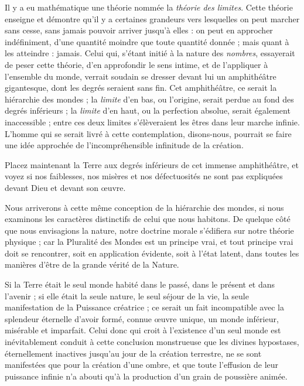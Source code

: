 \documentclass[a4paper, 11pt, oneside, landscape]{article}
\begin{document}
Il y a eu mathématique une théorie nommée la \emph{théorie des limites}. Cette théorie enseigne et démontre qu'il y a certaines grandeurs vers lesquelles on peut marcher sans cesse, sans jamais pouvoir arriver jusqu'à elles : on peut en approcher indéfiniment, d'une quantité moindre que toute quantité donnée ; mais quant à les atteindre : jamais. Celui qui, s'étant initié à la nature des \emph{nombres}, essayerait de peser cette théorie, d'en approfondir le sens intime, et de l'appliquer à l'ensemble du monde, verrait soudain se dresser devant lui un amphithéâtre gigantesque, dont les degrés seraient sans fin. Cet amphithéâtre, ce serait la hiérarchie des mondes ; la \emph{limite} d'en bas, ou l'origine, serait perdue au fond des degrés inférieurs ; la \emph{limite} d'en haut, ou la perfection absolue, serait également inaccessible ; entre ces deux limites s'élèveraient les êtres dans leur marche infinie. L'homme qui se serait livré à cette contemplation, disons-nous, pourrait se faire une idée approchée de l'incompréhensible infinitude de la création.

Placez maintenant la Terre aux degrés inférieurs de cet immense amphithéâtre, et voyez si nos faiblesses, nos misères et nos défectuosités ne sont pas expliquées devant Dieu et devant son œuvre.

Nous arriverons à cette même conception de la hiérarchie des mondes, si nous examinons les caractères distinctifs de celui que nous habitons. De quelque côté que nous envisagions la nature, notre doctrine morale s'édifiera sur notre théorie physique ; car la Pluralité des Mondes est un principe vrai, et tout principe vrai doit se rencontrer, soit en application évidente, soit à l'état latent, dans toutes les manières d'être de la grande vérité de la Nature.

Si la Terre était le seul monde habité dans le passé, dans le présent et dans l'avenir ; si elle était la seule nature, le seul séjour de la vie, la seule manifestation de la Puissance créatrice ; ce serait un fait incompatible avec la splendeur éternelle d'avoir formé, connue œuvre unique, un monde inférieur, misérable et imparfait. Celui donc qui croit à l'existence d'un seul monde est inévitablement conduit à cette conclusion monstrueuse que les divines hypostases, éternellement inactives jusqu'au jour de la création terrestre, ne se sont manifestées que pour la création d'une ombre, et que toute l'effusion de leur puissance infinie n'a abouti qu'à la production d'un grain de poussière animée.
\end{document}
